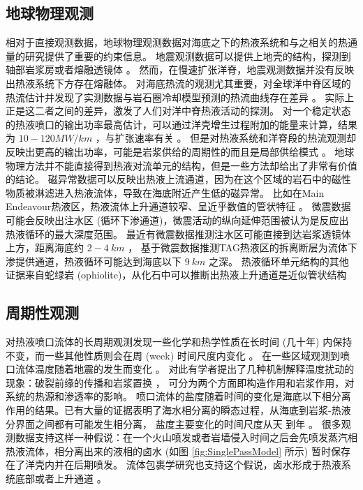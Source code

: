 \subsection{地球物理观测} 
相对于直接观测数据，地球物理观测数据对海底之下的热液系统和与之相关的热通量的研究提供了重要的约束信息。
地震观测数据可以提供上地壳的结构，探测到轴部岩浆房或者熔融透镜体 \citep{dunn2000three} 。
然而，在慢速扩张洋脊，地震观测数据并没有反映出热液系统下方存在熔融体。
对海底热流的观测尤其重要，对全球洋中脊区域的热流估计并发现了实测数据与岩石圈冷却模型预测的热流曲线存在差异 \citep{stein1994constraints} 。
实际上正是这二者之间的差异，激发了人们对洋中脊热液活动的探测。
对一个稳定状态的热液喷口的输出功率最高估计，可以通过洋壳增生过程附加的能量来计算，结果为 $ 10 - 120 MW/km $ ，与扩张速率有关 \citep{coumou2008numerical} 。
但是对热液系统和洋脊段的热流观测却反映出更高的输出功率，可能是岩浆供给的周期性的而且是局部供给模式 \citep{baker1987cataclysmic,baker1996relationship,ramondenc2006first,germanovich2015measuring} 。
地球物理方法并不能直接得到热液对流单元的结构，但是一些方法却给出了非常有价值的结论。
磁异常数据可以反映出热液上流通道，因为在这个区域的岩石中的磁性物质被淋滤进入热液流体，导致在海底附近产生低的磁异常。
比如在Main Endeavour热液区，热液流体上升通道较窄、呈近乎数值的管状特征 \citep{tivey2002crustal} 。
微震数据可能会反映出注水区 (循环下渗通道)，微震活动的纵向延伸范围被认为是反应出热液循环的最大深度范围。
最近有微震数据推测注水区可能直接到达岩浆透镜体上方，距离海底约  $ 2-4\ km $  \cite{tolstoy2008seismic} ，
 \cite{sohn2007kinematics} 基于微震数据推测TAG热液区的拆离断层为流体下渗提供通道，热液循环可能达到海底以下  $ 9\ km $ 之深。
热液循环单元结构的其他证据来自蛇绿岩 (ophiolite)，从化石中可以推断出热液上升通道是近似管状结构 \citep{saccocia1995hydrothermal} 

\subsection{周期性观测} 
对热液喷口流体的长周期观测发现一些化学和热学性质在长时间 (几十年) 内保持不变，而一些其他性质则会在周 (week) 时间尺度内变化 \citep{von2003extraordinary,massoth1989submarine,von1990seafloor,von1997direct} 。
在一些区域观测到喷口流体温度随着地震的发生而变化 \citep{fornari1998time,johnson2000earthquake,pontbriand2014microearthquake} 。
对此有学者提出了几种机制解释温度扰动的现象：破裂前缘的传播和岩浆置换 \citep{wilcock2004physical,germanovich2011magmatic,von2004evolution} ，
可分为两个方面即构造作用和岩浆作用，对系统的热源和渗透率的影响。
喷口流体的盐度随着时间的变化是海底以下相分离作用的结果。已有大量的证据表明了海水相分离的瞬态过程，从海底到岩浆-热液分界面之间都有可能发生相分离，
盐度主要变化的时间尺度从天 \cite{von2003extraordinary} 到年 \citep{von1997direct,von2004evolution} 。
很多观测数据支持这样一种假说：在一个火山喷发或者岩墙侵入时间之后会先喷发蒸汽相热液流体，相分离出来的液相的卤水 (如图 \ref{fig:SinglePassModel} 所示) 暂时保存在了洋壳内并在后期喷发。
流体包裹学研究也支持这个假说，卤水形成于热液系统底部或者上升通道 \citep{saccocia1995hydrothermal,nehlig1991salinity,kelley1993fluid} 。

